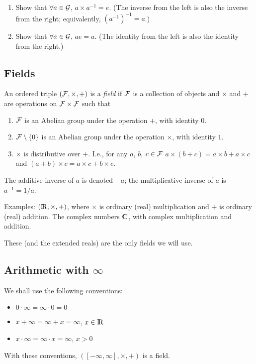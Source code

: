 \begin{Exercise}
        \begin{enumerate}
                \item Show that $\forall a \in {\cal G}$, $a \times a^{-1} = e$.
                        (The inverse from the left is also the
                        inverse from the right; equivalently, $(a^{-1})^{-1} = a$.)
                \item Show that $\forall a \in {\cal G}$, $ae = a$. (The identity from the left is
                        also the identity from the right.)
        \end{enumerate}
\end{Exercise}

\subsection{Fields}

\begin{Definition}
        An ordered triple $({\cal F}, \times, +)$ is a {\em field\/} if ${\cal F}$ is
        a collection of objects and $\times$ and $+$ are operations on ${\cal F} \times {\cal F}$
        such that
        \begin{enumerate}
                \item ${\cal F}$ is an Abelian group under the operation $+$, with identity 0.
                \item ${\cal F} \setminus \{0\}$ is an Abelian group under the operation $\times$,
                        with identity $1$.
                \item $\times$ is distributive over $+$. I.e., for any $a$, $b$, $c \in {\cal F}$
                        $a \times (b+c) = a \times b + a \times c$ and
                        $(a+b) \times c = a\times c + b \times c$.
        \end{enumerate}
        The additive inverse of $a$ is denoted $-a$; the multiplicative inverse of $a$ is
        $a^{-1} = 1/a$.
\end{Definition}

Examples:
$(\hbox{I\kern-.17em\hbox{R}}, \times, +)$, where $\times$ is ordinary (real) multiplication and $+$ is ordinary
(real) addition.
The complex numbers ${\bf C}$, with complex multiplication and addition.

These (and the extended reals) are the only fields we will use.

\subsection{Arithmetic with $\infty$}
We shall use the following conventions:
\begin{itemize}
        \item $0 \cdot \infty = \infty \cdot 0 = 0$
        \item $x + \infty = \infty + x = \infty$, $x \in \hbox{I\kern-.17em\hbox{R}}$
        \item $x \cdot \infty = \infty \cdot x = \infty$, $x > 0$
\end{itemize}
With these conventions, $([-\infty, \infty], \times, +)$ is a field.

